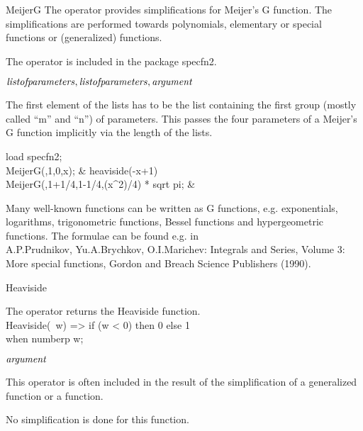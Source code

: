 \begin{Operator}{MeijerG}
The  operator provides simplifications for Meijer's G  
function. The simplifications are performed towards polynomials,
elementary or
special functions or (generalized)  functions.

The  operator is included in the package specfn2.

\begin{Syntax}
\(\meta{list of parameters},\meta{list of parameters},
   \meta{argument}\)
\end{Syntax}
The first element of the lists has to be the list containing the
first group (mostly called ``m'' and ``n'') of parameters. This passes
the  four parameters of a Meijer's G function implicitly via the
length of the lists.

\begin{Examples}
load specfn2;\\
MeijerG({{},1},{{0}},x);       &   heaviside(-x+1)\\
MeijerG({{}},{{1+1/4},1-1/4},(x^2)/4) * sqrt pi;
                & 
\end{Examples}

\begin{Comments}
Many well-known functions can be written as G functions,
e.g. exponentials, logarithms, trigonometric functions, Bessel functions
and hypergeometric functions.
The formulae can be found e.g. in \\
A.P.Prudnikov, Yu.A.Brychkov, O.I.Marichev: 
Integrals and Series, Volume 3: More special functions,
Gordon and Breach Science Publishers (1990).
\end{Comments}
\end{Operator}

\begin{Operator}{Heaviside}

The  operator returns the Heaviside function. \\

Heaviside(~w) => if (w < 0) then 0 else 1 \\
    when numberp w;

\begin{Syntax}
\(\meta{argument}\)
\end{Syntax}

\begin{Comments}
This operator is often included in the result of the simplification
of a generalized  function or a
 function.

No simplification is done for this function.
\end{Comments}
\end{Operator}


